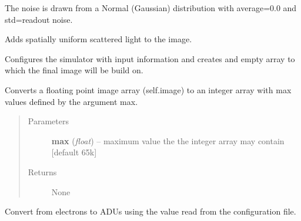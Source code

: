 \documentclass[a4paper,11pt,english]{sphinxmanual}
\begin{document}
\begin{fulllineitems}
\begin{fulllineitems}
The noise is drawn from a Normal (Gaussian) distribution with average=0.0 and std=readout noise.

\end{fulllineitems}


\begin{fulllineitems}
\label{simulator:simulator.simulator.VISsimulator.applyScatteredLight}
Adds spatially uniform scattered light to the image.

\end{fulllineitems}


\begin{fulllineitems}
\label{simulator:simulator.simulator.VISsimulator.configure}
Configures the simulator with input information and creates and empty array to which the final image will
be build on.

\end{fulllineitems}


\begin{fulllineitems}
\label{simulator:simulator.simulator.VISsimulator.discretise}
Converts a floating point image array (self.image) to an integer array with max values
defined by the argument max.
\begin{quote}\begin{description}
\item[{Parameters}] \leavevmode
\textbf{max} (\emph{float}) -- maximum value the the integer array may contain {[}default 65k{]}

\item[{Returns}] \leavevmode
None

\end{description}\end{quote}

\end{fulllineitems}


\begin{fulllineitems}
\label{simulator:simulator.simulator.VISsimulator.electrons2ADU}
Convert from electrons to ADUs using the value read from the configuration file.


\end{fulllineitems}
\end{fulllineitems}
\end{document}
